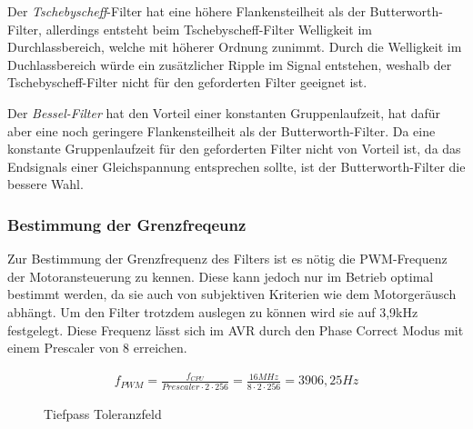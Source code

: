 Der \emph{Tschebyscheff}-Filter hat eine höhere Flankensteilheit als der Butterworth-Filter, allerdings entsteht beim Tschebyscheff-Filter Welligkeit im Durchlassbereich,
welche mit höherer Ordnung zunimmt. Durch die Welligkeit im Duchlassbereich würde ein zusätzlicher Ripple im Signal entstehen, weshalb der Tschebyscheff-Filter nicht
für den geforderten Filter geeignet ist. 

Der \emph{Bessel-Filter} hat den Vorteil einer konstanten Gruppenlaufzeit, hat dafür aber eine noch geringere Flankensteilheit als der Butterworth-Filter.
Da eine konstante Gruppenlaufzeit für den geforderten Filter nicht von Vorteil ist, da das Endsignals einer Gleichspannung entsprechen sollte, ist der Butterworth-Filter
die bessere Wahl.


\subsubsection{Bestimmung der Grenzfreqeunz}

Zur Bestimmung der Grenzfrequenz des Filters ist es nötig die PWM-Frequenz der Motoransteuerung zu kennen. Diese kann jedoch nur im Betrieb optimal bestimmt werden, da sie
auch von subjektiven Kriterien wie dem Motorgeräusch abhängt. Um den Filter trotzdem auslegen zu können wird sie auf 3,9kHz festgelegt. Diese Frequenz
lässt sich im AVR durch den Phase Correct Modus mit einem Prescaler von 8 erreichen.

\begin{align*}
f_{PWM}=\frac{f_{CPU}}{Prescaler\cdot 2 \cdot 256} = \frac{16 MHz }{8 \cdot 2 \cdot 256 }=3906,25 Hz
\end{align*}


\begin{figure}[H]
\centering
{}
\caption{Tiefpass Toleranzfeld}%
\label{fig:analog}
\end{figure}



